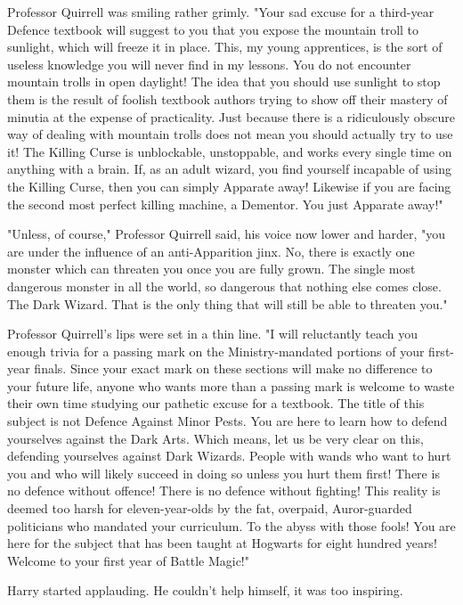 Professor Quirrell was smiling rather grimly. "Your sad excuse for a third-year
Defence textbook will suggest to you that you expose the mountain troll to
sunlight, which will freeze it in place. This, my young apprentices, is the
sort of useless knowledge you will never find in my lessons. You do not
encounter mountain trolls in open daylight! The idea that you should use
sunlight to stop them is the result of foolish textbook authors trying to show
off their mastery of minutia at the expense of practicality. Just because there
is a ridiculously obscure way of dealing with mountain trolls does not mean you
should actually try to use it! The Killing Curse is unblockable, unstoppable,
and works every single time on anything with a brain. If, as an adult wizard,
you find yourself incapable of using the Killing Curse, then you can simply
Apparate away! Likewise if you are facing the second most perfect killing
machine, a Dementor. You just Apparate away!"

"Unless, of course," Professor Quirrell said, his voice now lower and harder,
"you are under the influence of an anti-Apparition jinx. No, there is exactly
one monster which can threaten you once you are fully grown. The single most
dangerous monster in all the world, so dangerous that nothing else comes close.
The Dark Wizard. That is the only thing that will still be able to threaten
you."

Professor Quirrell's lips were set in a thin line. "I will reluctantly teach
you enough trivia for a passing mark on the Ministry-mandated portions of your
first-year finals. Since your exact mark on these sections will make no
difference to your future life, anyone who wants more than a passing mark is
welcome to waste their own time studying our pathetic excuse for a textbook.
The title of this subject is not Defence Against Minor Pests. You are here to
learn how to defend yourselves against the Dark Arts. Which means, let us be
very clear on this, defending yourselves against Dark Wizards. People with
wands who want to hurt you and who will likely succeed in doing so unless you
hurt them first! There is no defence without offence! There is no defence
without fighting! This reality is deemed too harsh for eleven-year-olds by the
fat, overpaid, Auror-guarded politicians who mandated your curriculum. To the
abyss with those fools! You are here for the subject that has been taught at
Hogwarts for eight hundred years! Welcome to your first year of Battle Magic!"

Harry started applauding. He couldn't help himself, it was too inspiring.

